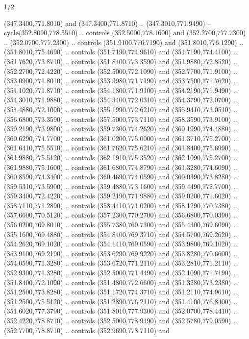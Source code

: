 \begin{flagdescription}{1/2}
\begin{scope}[xshift=0.5\flaglength]
\begin{scope}[scale=0.00745\flagwidth,xshift=-12.1mm,yshift=41.7mm]
\begin{scope}[y=0.80pt, x=0.80pt, yscale=-1, xscale=1, inner sep=0pt, outer sep=0pt]
\begin{scope}[cm={{1.33333,0.0,0.0,-1.33333,(0.0,114.66667)}}]
\begin{scope}[scale=0.100]
  (347.3400,771.8010) and (347.3400,771.8710) .. (347.3010,771.9490) --
  cycle(352.8090,778.5510) .. controls (352.5000,778.1600) and
  (352.2700,777.7300) .. (352.0700,777.2300) .. controls (351.9100,776.7190) and
  (351.8010,776.1290) .. (351.8010,775.4690) .. controls (351.7190,774.9610) and
  (351.7190,774.4100) .. (351.7620,773.8710) .. controls (351.8400,773.3590) and
  (351.9880,772.8520) .. (352.2700,772.4220) .. controls (352.5000,772.1090) and
  (352.7700,771.9100) .. (353.0900,771.8010) .. controls (353.3980,771.7190) and
  (353.7500,771.7620) .. (354.1020,771.8710) .. controls (354.1800,771.9100) and
  (354.2190,771.9490) .. (354.3010,771.9880) .. controls (354.3400,772.0310) and
  (354.3790,772.0700) .. (354.4880,772.1090) .. controls (355.1990,772.6210) and
  (355.9410,773.0510) .. (356.6800,773.3590) .. controls (357.5000,773.7110) and
  (358.3590,773.9100) .. (359.2190,773.9800) .. controls (359.7300,774.2620) and
  (360.1990,774.4880) .. (360.6290,774.7700) .. controls (361.0200,775.0000) and
  (361.3710,775.2700) .. (361.6410,775.5510) .. controls (361.7620,775.6210) and
  (361.8400,775.6990) .. (361.9880,775.5120) .. controls (362.1910,775.3520) and
  (362.1090,775.2700) .. (361.9880,775.1600) .. controls (361.6800,774.8790) and
  (361.3280,774.6090) .. (360.8590,774.3400) .. controls (360.4690,774.0590) and
  (360.0390,773.8280) .. (359.5310,773.5900) .. controls (359.4880,773.1600) and
  (359.4490,772.7700) .. (359.3400,772.4220) .. controls (359.2190,771.9880) and
  (359.0200,771.6020) .. (358.7110,771.2890) .. controls (358.4410,771.0200) and
  (358.1290,770.7380) .. (357.6600,770.5120) .. controls (357.2300,770.2700) and
  (356.6800,770.0390) .. (356.0200,769.8010) .. controls (355.7380,769.7300) and
  (355.4300,769.6090) .. (355.1600,769.4880) .. controls (354.8400,769.3710) and
  (354.5700,769.2620) .. (354.2620,769.1020) .. controls (354.1410,769.0590) and
  (353.9800,769.1020) .. (353.9100,769.2190) .. controls (353.6290,769.9220) and
  (353.8280,770.6600) .. (354.0590,771.3280) .. controls (353.6720,771.2110) and
  (353.2810,771.2110) .. (352.9300,771.3280) .. controls (352.5000,771.4490) and
  (352.1090,771.7190) .. (351.8400,772.1090) .. controls (351.4800,772.6600) and
  (351.3280,773.2380) .. (351.2500,773.8280) .. controls (351.1720,774.3710) and
  (351.2110,774.9610) .. (351.2500,775.5120) .. controls (351.2890,776.2110) and
  (351.4100,776.8400) .. (351.6020,777.3790) .. controls (351.8010,777.9300) and
  (352.0700,778.4410) .. (352.4220,778.8710) .. controls (352.5000,778.9490) and
  (352.5780,779.0590) .. (352.7700,778.8710) .. controls (352.9690,778.7110) and

\end{scope}
\end{scope}
\end{scope}
\end{scope}
\end{scope}
\end{flagdescription}
